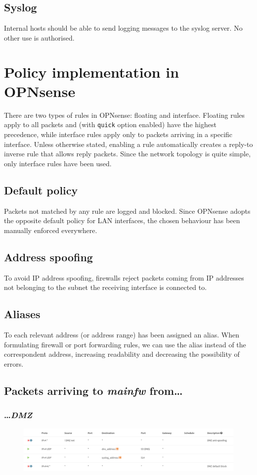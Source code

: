 \documentclass{homework}
\newcommand{\opn}{OPNsense\xspace}
\newcommand{\dmz}{\textit{DMZ}\xspace}
\newcommand{\mainfw}{\textit{mainfw}\xspace}
\begin{document}
    \subsection{Syslog}
    Internal hosts should be able to send logging messages to the syslog server.
    No other use is authorised.
    
    
    \section{Policy implementation in \opn}
    There are two types of rules in \opn: floating and interface.
    Floating rules apply to all packets and (with \texttt{quick} option enabled) have the highest precedence, while interface rules apply only to packets arriving in a specific interface.
    Unless otherwise stated, enabling a rule automatically creates a reply-to inverse rule that allows reply packets.
    Since the network topology is quite simple, only interface rules have been used.
    
    \subsection{Default policy}
    Packets not matched by any rule are logged and blocked.
    Since \opn adopts the opposite default policy for LAN interfaces, the chosen behaviour has been manually enforced everywhere.
    
    \subsection{Address spoofing}
    To avoid IP address spoofing, firewalls reject packets coming from IP addresses not belonging to the subnet the receiving interface is connected to.
    
    \subsection{Aliases}
    To each relevant address (or address range) has been assigned an alias.
    When formulating firewall or port forwarding rules, we can use the alias instead of the correspondent address, increasing readability and decreasing the possibility of errors.
    
    \subsection{Packets arriving to \mainfw from\dots}
    \subsubsection{\dots \dmz}
    \begin{figure}[H]
        \centering
        \includegraphics[width=\linewidth]{images/mainfw-DMZ}
        \label{fig:mainfw-dmz}
    \end{figure}
    
\end{document}
